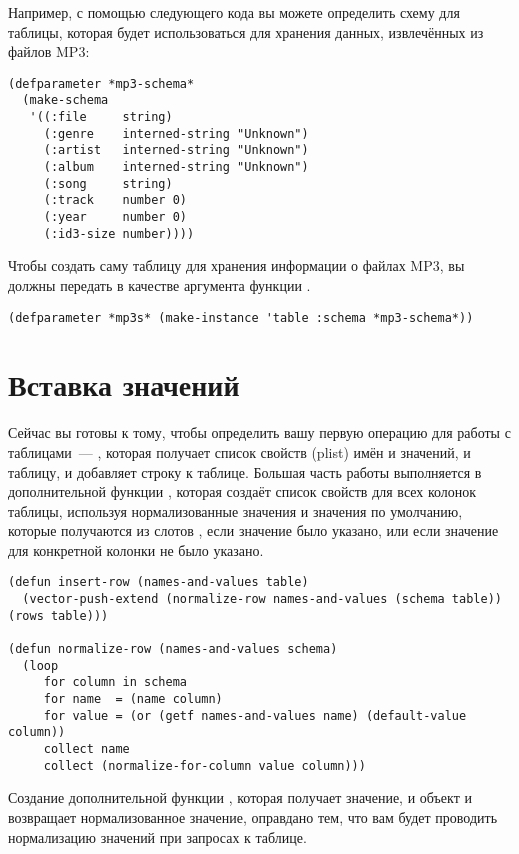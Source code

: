 Например, с помощью следующего кода вы можете определить схему для таблицы, которая будет
использоваться для хранения данных, извлечённых из файлов MP3:

\begin{lstlisting}
(defparameter *mp3-schema* 
  (make-schema 
   '((:file     string)
     (:genre    interned-string "Unknown")
     (:artist   interned-string "Unknown")
     (:album    interned-string "Unknown")
     (:song     string)
     (:track    number 0)
     (:year     number 0)
     (:id3-size number))))
\end{lstlisting}

Чтобы создать саму таблицу для хранения информации о файлах MP3, вы должны передать
 в качестве аргумента  функции .

\begin{lstlisting}
(defparameter *mp3s* (make-instance 'table :schema *mp3-schema*))
\end{lstlisting}

\section{Вставка значений}

Сейчас вы готовы к тому, чтобы определить вашу первую операцию для работы с таблицами~---
, которая получает список свойств (plist) имён и значений, и таблицу, и
добавляет строку к таблице.  Большая часть работы выполняется в дополнительной функции
, которая создаёт список свойств для всех колонок таблицы, используя
нормализованные значения и значения по умолчанию, которые получаются из слотов
, если значение было указано, или  если
значение для конкретной колонки не было указано.

\begin{lstlisting}
(defun insert-row (names-and-values table)
  (vector-push-extend (normalize-row names-and-values (schema table)) (rows table)))

(defun normalize-row (names-and-values schema)
  (loop
     for column in schema
     for name  = (name column)
     for value = (or (getf names-and-values name) (default-value column))
     collect name
     collect (normalize-for-column value column)))
\end{lstlisting}

Создание дополнительной функции , которая получает значение, и
объект  и возвращает нормализованное значение, оправдано тем, что вам будет
проводить нормализацию значений при запросах к таблице.

